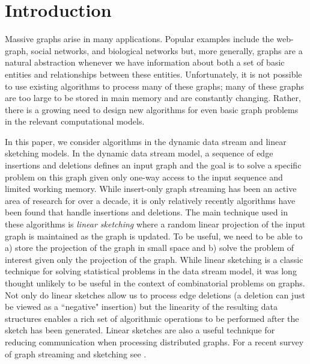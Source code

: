 


\section{Introduction}

Massive graphs arise in many applications. Popular examples include the web-graph, social networks, and biological networks but, more generally, graphs are a natural abstraction whenever we have information about both a set of basic entities and relationships between these entities. Unfortunately, it is not possible to use existing algorithms to process many of these graphs; many of these graphs are too large to be stored in main memory and are constantly changing. Rather, there is a growing need to design new algorithms for even basic graph problems in the relevant computational models. 

In this paper, we consider algorithms in the dynamic data stream and linear sketching models. In the dynamic data stream model, a sequence of edge insertions and deletions defines an input graph and the goal is to solve a specific problem on this graph given only one-way access to the input sequence and limited working memory. While insert-only graph streaming has been an active area of research for over a decade, it is only relatively recently algorithms have been found that handle insertions and deletions\cite{AhnGM12a,AhnGM12b,AhnGM13,KapralovLMMS14,KapralovW14,GoelKP12,KutzkovP14a}. The main technique used in these algorithms is \emph{linear sketching} where a random linear projection of the input graph is maintained as the graph is updated. To be useful, we need to be able to a) store the projection of the graph in small space and b) solve the problem of interest given only the projection of the graph. While linear sketching is a classic technique for solving statistical problems in the data stream model, it was long thought unlikely to be useful in the context of combinatorial problems on graphs. Not only do linear sketches allow us to process edge deletions (a deletion can just be viewed as a ``negative" insertion) but the linearity of the resulting data structures enables a rich set of algorithmic operations to be performed after the sketch has been generated. Linear sketches are also a useful technique for reducing communication when processing distributed graphs. For a recent survey of graph streaming and sketching  see  \cite{McGregor14}.
 

